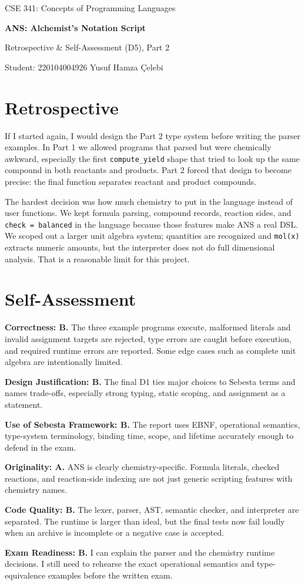 \documentclass[11pt,a4paper]{article}
\newcommand{\code}[1]{\texttt{#1}}
\begin{document}
\begin{center}
{\footnotesize\color{anscaption}CSE 341: Concepts of Programming Languages\par}
{\huge\bfseries ANS: Alchemist's Notation Script\par}
{\large Retrospective \& Self-Assessment (D5), Part 2\par}
{\footnotesize\color{anscaption}Student: 220104004926 Yusuf Hamza Çelebi}
\end{center}

\section*{Retrospective}
If I started again, I would design the Part 2 type system before writing the parser examples. In Part 1 we allowed programs that parsed but were chemically awkward, especially the first \code{compute\_yield} shape that tried to look up the same compound in both reactants and products. Part 2 forced that design to become precise: the final function separates reactant and product compounds.

The hardest decision was how much chemistry to put in the language instead of user functions. We kept formula parsing, compound records, reaction sides, and \code{check = balanced} in the language because those features make ANS a real DSL. We scoped out a larger unit algebra system; quantities are recognized and \code{mol(x)} extracts numeric amounts, but the interpreter does not do full dimensional analysis. That is a reasonable limit for this project.

\section*{Self-Assessment}
\textbf{Correctness: B.} The three example programs execute, malformed literals and invalid assignment targets are rejected, type errors are caught before execution, and required runtime errors are reported. Some edge cases such as complete unit algebra are intentionally limited.

\textbf{Design Justification: B.} The final D1 ties major choices to Sebesta terms and names trade-offs, especially strong typing, static scoping, and assignment as a statement.

\textbf{Use of Sebesta Framework: B.} The report uses EBNF, operational semantics, type-system terminology, binding time, scope, and lifetime accurately enough to defend in the exam.

\textbf{Originality: A.} ANS is clearly chemistry-specific. Formula literals, checked reactions, and reaction-side indexing are not just generic scripting features with chemistry names.

\textbf{Code Quality: B.} The lexer, parser, AST, semantic checker, and interpreter are separated. The runtime is larger than ideal, but the final tests now fail loudly when an archive is incomplete or a negative case is accepted.

\textbf{Exam Readiness: B.} I can explain the parser and the chemistry runtime decisions. I still need to rehearse the exact operational semantics and type-equivalence examples before the written exam.
\end{document}
